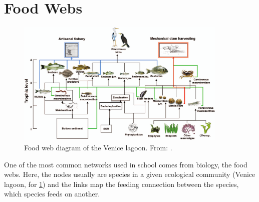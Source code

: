 \section{Food Webs}

    \begin{figure}[H]
        \centering
        \includegraphics[width=0.9\textwidth]{images/GEN-009.png}

        \caption{Food web diagram of the Venice lagoon. From: \cite{heymans}.}
        \label{fig:food-web}
    \end{figure}

    One of the most common networks used in school comes from biology, the food webs. Here, the nodes usually are species in a given ecological community (Venice lagoon, for \cref{fig:food-web}) and the links map the feeding connection between the species, which species feeds on another.
